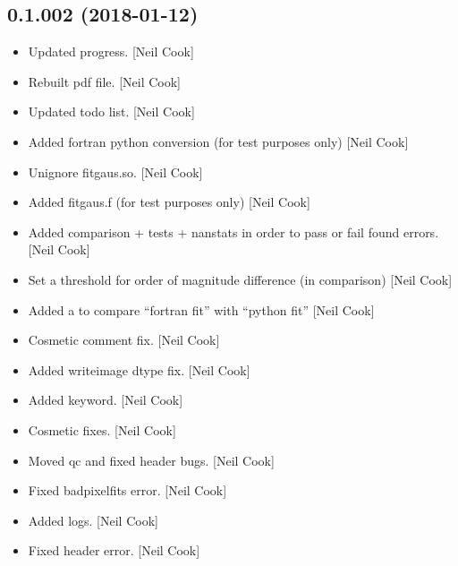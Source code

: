\documentclass[a4paper,10pt,english]{report}
\begin{document}
\subsection{0.1.002 (2018-01-12)}
\label{\detokenize{misc/changelog:id502}}\begin{itemize}
\item {} 
Updated progress. {[}Neil Cook{]}

\item {} 
Rebuilt pdf file. {[}Neil Cook{]}

\item {} 
Updated todo list. {[}Neil Cook{]}

\item {} 
Added fortran python conversion (for test purposes only) {[}Neil Cook{]}

\item {} 
Unignore fitgaus.so. {[}Neil Cook{]}

\item {} 
Added fitgaus.f (for test purposes only) {[}Neil Cook{]}

\item {} 
Added comparison + tests + nanstats in order to pass or fail found
errors. {[}Neil Cook{]}

\item {} 
Set a threshold for order of magnitude difference (in comparison)
{[}Neil Cook{]}

\item {} 
Added a  to compare “fortran fit” with “python fit” {[}Neil
Cook{]}

\item {} 
Cosmetic comment fix. {[}Neil Cook{]}

\item {} 
Added writeimage dtype fix. {[}Neil Cook{]}

\item {} 
Added  keyword. {[}Neil Cook{]}

\item {} 
Cosmetic fixes. {[}Neil Cook{]}

\item {} 
Moved qc and fixed header bugs. {[}Neil Cook{]}

\item {} 
Fixed badpixelfits error. {[}Neil Cook{]}

\item {} 
Added logs. {[}Neil Cook{]}

\item {} 
Fixed header error. {[}Neil Cook{]}

\end{itemize}
\end{document}
